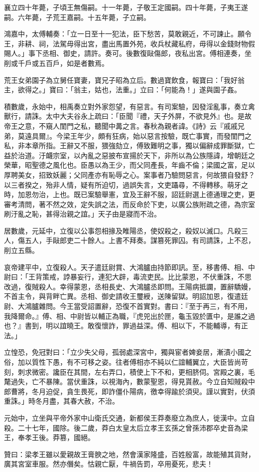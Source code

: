 \begin{pinyinscope}
襄立四十年薨，子頃王無傷嗣。十一年薨，子敬王定國嗣。四十年薨，子夷王遂嗣。六年薨，子荒王嘉嗣。十五年薨，子立嗣。

鴻嘉中，太傅輔奏：「立一日至十一犯法，臣下愁苦，莫敢親近，不可諫止。願令王，非耕、祠，法駕毋得出宮，盡出馬置外苑，收兵杖藏私府，毋得以金錢財物假賜人。」事下丞相、御史，請許。奏可。後數復敺傷郎，夜私出宮。傅相連奏，坐削或千戶或五百戶，如是者數焉。

荒王女弟園子為立舅任寶妻，寶兄子昭為立后。數過寶飲食，報寶曰：「我好翁主，欲得之。」寶曰：「翁主，姑也，法重。」立曰：「何能為！」遂與園子姦。

積數歲，永始中，相禹奏立對外家怨望，有惡言。有司案驗，因發淫亂事，奏立禽獸行，請誅。太中大夫谷永上疏曰：「臣聞『禮，天子外屏，不欲見外』也。是故帝王之意，不窺人閨門之私，聽聞中冓之言。春秋為親者諱。《詩》云『戚戚兄弟，莫遠具爾』。今梁王年少，頗有狂病，始以惡言按驗，既亡事實，而發閨門之私，非本章所指。王辭又不服，猥強劾立，傅致難明之事，獨以偏辭成罪斷獄，亡益於治道。汙衊宗室，以內亂之惡披布宣揚於天下，非所以為公族隱諱，增朝廷之榮華，昭聖德之風化也。臣愚以為王少，而父同產長，年齒不倫；梁國之富，足以厚聘美女，招致妖麗；父同產亦有恥辱之心。案事者乃驗問惡言，何故猥自發舒？以三者揆之，殆非人情，疑有所迫切，過誤失言，文吏躡尋，不得轉移。萌牙之時，加恩勿治，上也。既已案驗舉憲，宜及王辭不服，詔廷尉選上德通理之吏，更審考清問，著不然之效，定失誤之法，而反命於下吏，以廣公族附疏之德，為宗室刷汙亂之恥，甚得治親之誼。」天子由是寢而不治。

居數歲，元延中，立復以公事怨相掾及睢陽丞，使奴殺之，殺奴以滅口。凡殺三人，傷五人，手敺郎吏二十餘人。上書不拜奏。謀篡死罪囚。有司請誅，上不忍，削立五縣。

哀帝建平中，立復殺人。天子遣廷尉賞、大鴻臚由持節即訊。至，移書傅、相、中尉曰：「王背策戒，誖暴妄行，連犯大辟，毒流吏民。比比蒙恩，不伏重誅，不思改過，復賊殺人。幸得蒙恩，丞相長史、大鴻臚丞即問。王陽病抵讕，置辭驕嫚，不首主令，與背畔亡異。丞相、御史請收王璽綬，送陳留獄。明詔加恩，復遣廷尉、大鴻臚雜問。今王當受詔置辭，恐復不首實對。書曰：『至于再三，有不用，我降爾命。』傅、相、中尉皆以輔正為職，『虎兕出於匣，龜玉毀於匱中，是誰之過也？』書到，明以誼曉王。敢復懷詐，罪過益深。傅、相以下，不能輔導，有正法。」

立惶恐，免冠對曰：「立少失父母，孤弱處深宮中，獨與宦者婢妾居，漸漬小國之俗，加以質性下愚，有不可移之姿。往者傅相亦不純以仁誼輔翼立，大臣皆尚苛刻，刺求微密。讒臣在其間，左右弄口，積使上下不和，更相脐伺。宮殿之裏，毛氂過失，亡不暴陳。當伏重誅，以視海內，數蒙聖恩，得見貰赦。今立自知賊殺中郎曹將，冬月迫促，貪生畏死，即詐僵仆陽病，徼幸得踰於須臾。謹以實對，伏須重誅。」時冬月盡，其春大赦，不治。

元始中，立坐與平帝外家中山衛氏交通，新都侯王莽奏廢立為庶人，徙漢中。立自殺。二十七年，國除。後二歲，莽白太皇太后立孝王玄孫之曾孫沛郡卒史音為梁王，奉孝王後。莽篡，國絕。

贊曰：梁孝王雖以愛親故王膏腴之地，然會漢家隆盛，百姓殷富，故能殖其貨財，廣其宮室車服。然亦僭矣。怙親亡厭，牛禍告罰，卒用憂死，悲夫！


\end{pinyinscope}